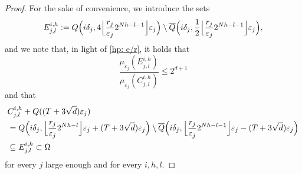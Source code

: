 \documentclass{article}
\theoremstyle{plain}
\theoremstyle{definition}
\newcommand{\ej}{\varepsilon_j}
\newcommand{\rj}{r_j}
\newcommand{\Q}
{\overline{Q}}
\numberwithin{equation}{section}
\begin{document}
\begin{proof}
For the sake of convenience, we introduce the sets
\begin{equation}\label{Ejlih}
    E^{i, h}_{j,l}:=Q\Bigl(i\delta_{j},4\Bigl\lfloor\frac{\rj}{\varepsilon_{j}}2^{Nh-l-1}\Bigr\rfloor\varepsilon_{j}\Bigr)\setminus   \Q\Bigl(i\delta_{j},\frac{1}{2}\Bigl\lfloor\frac{\rj}{\varepsilon_{j}}2^{Nh-l-1}\Bigr\rfloor\varepsilon_{j}\Bigr),
\end{equation}
and we note that, in light of \eqref{hp: e/r}, it holds that
\begin{equation}\label{eq: per usare lemma long range}
    \frac{\mu_{\ej}(E^{i,h}_{j,l})}{\mu_{\ej}(C^{i,h}_{j,l})}\leq 2^{d+1}
\end{equation}
and that
\begin{align}\notag
& C^{i, h}_{j,l}+Q((T+3\sqrt{d})\ej)\\ \notag
& = Q\Bigl(i\delta_{j},\Bigl\lfloor\frac{\rj}{\varepsilon_{j}}2^{Nh-l}\Bigr\rfloor\varepsilon_{j}+(T+3\sqrt{d})\ej\Bigr)\setminus   \Q\Bigl(i\delta_{j},\Bigl\lfloor\frac{\rj}{\varepsilon_{j}}2^{Nh-l-1}\Bigr\rfloor\varepsilon_{j}-(T+3\sqrt{d})\ej\Bigr)\\ \label{eq: per usare lemma long range 2}
&\subseteq E^{i, h}_{j,l}\subset \Omega
\end{align} 
for every $j$ large enough and for every $i,h,l$. 


\end{proof}
\end{document}
